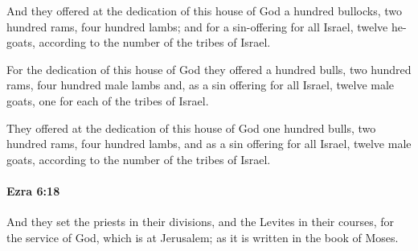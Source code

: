 			\begin{versebox}
					\item[BHS] 
					\item[LXX] 
					\item[ASV] And they offered at the dedication of this house of God a hundred bullocks, two hundred rams, four hundred lambs; and for a sin-offering for all Israel, twelve he-goats, according to the number of the tribes of Israel.
					\item[NIV] For the dedication of this house of God they offered a hundred bulls, two hundred rams, four hundred male lambs and, as a sin offering for all Israel, twelve male goats, one for each of the tribes of Israel.
					\item[NRSV] They offered at the dedication of this house of God one hundred bulls, two hundred rams, four hundred lambs, and as a sin offering for all Israel, twelve male goats, according to the number of the tribes of Israel.
			\end{versebox}

		\paragraph{Ezra 6:18} %
			\label{EZRA-6-18}

			And they set the priests in their divisions, and the Levites in their courses, for the service of God, which is at Jerusalem; as it is written in the book of Moses.

